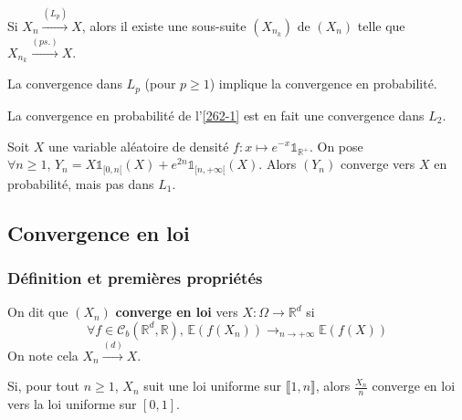 
  \begin{proposition}
    Si $X_n \overset{(L_p)}{\longrightarrow} X$, alors il existe une sous-suite $(X_{n_k})$ de $(X_n)$ telle que $X_{n_k} \overset{(ps.)}{\longrightarrow} X$.
  \end{proposition}

  \begin{theorem}
    La convergence dans $L_p$ (pour $p \geq 1$) implique la convergence en probabilité.
  \end{theorem}

  \begin{example}
    La convergence en probabilité de l'\cref{262-1} est en fait une convergence dans $L_2$.
  \end{example}


  \begin{cexample}
    Soit $X$ une variable aléatoire de densité $f : x \mapsto e^{-x} \mathbb{1}_{\mathbb{R}^+}$. On pose $\forall n \geq 1, \, Y_n = X \mathbb{1}_{[0,n[}(X) + e^{2n} \mathbb{1}_{[n,+\infty[}(X)$. Alors $(Y_n)$ converge vers $X$ en probabilité, mais pas dans $L_1$.
  \end{cexample}

  \subsection{Convergence en loi}

  \subsubsection{Définition et premières propriétés}


  \begin{definition}
    On dit que $(X_n)$ \textbf{converge en loi} vers $X : \Omega \rightarrow \mathbb{R}^d$ si
    \[ \forall f \in \mathcal{C}_b(\mathbb{R}^d, \mathbb{R}), \, \mathbb{E}(f(X_n)) \longrightarrow_{n \rightarrow +\infty} \mathbb{E}(f(X)) \]
    On note cela $X_n \overset{(d)}{\longrightarrow} X$.
  \end{definition}


  \begin{example}
    Si, pour tout $n \geq 1$, $X_n$ suit une loi uniforme sur $\llbracket 1, n \rrbracket$, alors $\frac{X_n}{n}$ converge en loi vers la loi uniforme sur $[0,1]$.
  \end{example}

